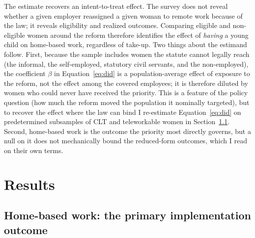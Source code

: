 \documentclass[12pt]{article}
\begin{document}
The estimate recovers an intent-to-treat effect. The survey does not reveal whether a given employer reassigned a given woman to remote work because of the law; it reveals eligibility and realized outcomes. Comparing eligible and non-eligible women around the reform therefore identifies the effect of \emph{having} a young child on home-based work, regardless of take-up. Two things about the estimand follow. First, because the sample includes women the statute cannot legally reach (the informal, the self-employed, statutory civil servants, and the non-employed), the coefficient $\beta$ in Equation~\eqref{eq:did} is a population-average effect of exposure to the reform, not the effect among the covered employees; it is therefore diluted by women who could never have received the priority. This is a feature of the policy question (how much the reform moved the population it nominally targeted), but to recover the effect where the law can bind I re-estimate Equation~\eqref{eq:did} on predetermined subsamples of CLT and teleworkable women in Section~\ref{sec:firststage}. Second, home-based work is the outcome the priority most directly governs, but a null on it does not mechanically bound the reduced-form outcomes, which I read on their own terms.

\section{Results}\label{sec:results}

\subsection{Home-based work: the primary implementation outcome}\label{sec:firststage}
\end{document}
